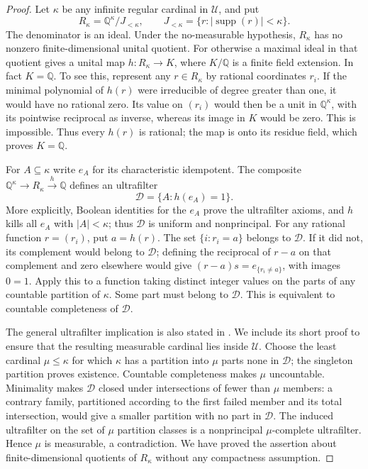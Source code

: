 \begin{proof}
Let $\kappa$ be any infinite regular cardinal in $\mathcal U$, and put
\[
 R_\kappa=\mathbb Q^\kappa/J_{<\kappa},\qquad
 J_{<\kappa}=\{r:|\operatorname{supp}(r)|<\kappa\}.
                                                               \tag{H5.9.4}
\]
The denominator is an ideal. Under the no-measurable hypothesis,
$R_\kappa$ has no nonzero finite-dimensional unital quotient.
For otherwise a maximal ideal in that quotient gives a unital
map $h:R_\kappa\to K$, where $K/\mathbb Q$ is a finite field
extension. In fact $K=\mathbb Q$. To see this, represent any
$r\in R_\kappa$ by rational coordinates $r_i$. If the minimal
polynomial of $h(r)$ were irreducible of degree greater than one,
it would have no rational zero. Its value on $(r_i)$ would then
be a unit in $\mathbb Q^\kappa$, with its pointwise reciprocal
as inverse, whereas its image in $K$ would be zero. This is
impossible. Thus every $h(r)$ is rational; the map is onto its
residue field, which proves $K=\mathbb Q$.

For $A\subseteq\kappa$ write $e_A$ for its characteristic
idempotent. The composite $\mathbb Q^\kappa\to R_\kappa
\xrightarrow{h}\mathbb Q$ defines an ultrafilter
\[
                  \mathcal D=\{A:h(e_A)=1\}.
\]
More explicitly, Boolean identities for the $e_A$ prove the
ultrafilter axioms, and $h$ kills all $e_A$ with $|A|<\kappa$;
thus $\mathcal D$ is uniform and nonprincipal. For any rational
function $r=(r_i)$, put $a=h(r)$. The set
$\{i:r_i=a\}$ belongs to $\mathcal D$. If it did not, its
complement would belong to $\mathcal D$; defining the reciprocal
of $r-a$ on that complement and zero elsewhere would give
$(r-a)s=e_{\{r_i\ne a\}}$, with images $0=1$.
Apply this to a function taking distinct integer values on the
parts of any countable partition of $\kappa$. Some part must
belong to $\mathcal D$. This is equivalent to countable
completeness of $\mathcal D$.

The general ultrafilter implication is also stated in
\citet[Theorem 1.1]{EH5BSZ2026}. We include its short proof
to ensure that the resulting measurable cardinal lies inside
$\mathcal U$. Choose the least cardinal $\mu\leq\kappa$ for
which $\kappa$ has a partition into $\mu$ parts none in
$\mathcal D$; the singleton partition proves existence.
Countable completeness makes $\mu$ uncountable. Minimality
makes $\mathcal D$ closed under intersections of fewer than
$\mu$ members: a contrary family, partitioned according to
the first failed member and its total intersection, would
give a smaller partition with no part in $\mathcal D$.
The induced ultrafilter on the set of $\mu$ partition classes
is a nonprincipal $\mu$-complete ultrafilter. Hence $\mu$
is measurable, a contradiction. We have proved the assertion
about finite-dimensional quotients of $R_\kappa$ without
any compactness assumption.


\end{proof}
